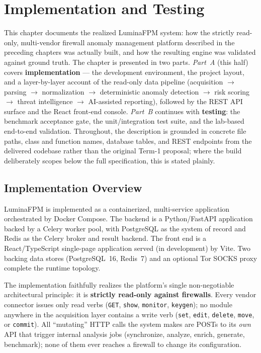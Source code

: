 \documentclass[12pt,a4paper]{report}
\renewcommand{\_}{\textunderscore\allowbreak}
\begin{document}
\chapter{Implementation and Testing}
\label{ch:implementation}

This chapter documents the realized LuminaFPM system: how the strictly read-only, multi-vendor firewall anomaly management platform described in the preceding chapters was actually built, and how the resulting engine was validated against ground truth. The chapter is presented in two parts. \emph{Part~A} (this half) covers \textbf{implementation} --- the development environment, the project layout, and a layer-by-layer account of the read-only data pipeline (acquisition $\rightarrow$ parsing $\rightarrow$ normalization $\rightarrow$ deterministic anomaly detection $\rightarrow$ risk scoring $\rightarrow$ threat intelligence $\rightarrow$ AI-assisted reporting), followed by the REST API surface and the React front-end console. \emph{Part~B} continues with \textbf{testing}: the benchmark acceptance gate, the unit/integration test suite, and the lab-based end-to-end validation. Throughout, the description is grounded in concrete file paths, class and function names, database tables, and REST endpoints from the delivered codebase rather than the original Term-1 proposal; where the build deliberately scopes below the full specification, this is stated plainly.

\section{Implementation Overview}
\label{sec:ch4-impl-overview}

LuminaFPM is implemented as a containerized, multi-service application orchestrated by Docker Compose. The backend is a Python/FastAPI application backed by a Celery worker pool, with PostgreSQL as the system of record and Redis as the Celery broker and result backend. The front end is a React/TypeScript single-page application served (in development) by Vite. Two backing data stores (PostgreSQL~16, Redis~7) and an optional Tor SOCKS proxy complete the runtime topology.

The implementation faithfully realizes the platform's single non-negotiable architectural principle: it is \textbf{strictly read-only against firewalls}. Every vendor connector issues only read verbs (\texttt{GET}, \texttt{show}, \texttt{monitor}, \texttt{keygen}); no module anywhere in the acquisition layer contains a write verb (\texttt{set}, \texttt{edit}, \texttt{delete}, \texttt{move}, or \texttt{commit}). All ``mutating'' HTTP calls the system makes are POSTs to its \emph{own} API that trigger internal analysis jobs (synchronize, analyze, enrich, generate, benchmark); none of them ever reaches a firewall to change its configuration.
\end{document}
